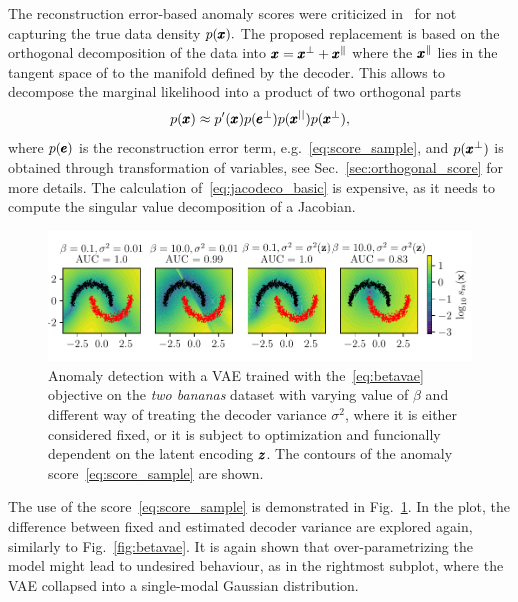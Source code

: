 The reconstruction error-based anomaly scores were criticized in~\cite{pidhorskyi2018generative} for not capturing the true data density $p(\pmb{{x}}).$ The proposed replacement is based on the orthogonal decomposition of the data into $\pmb{{x}}=\pmb{{x}}^\bot + \pmb{{x}}^{\parallel} $ where the $\pmb{{x}}^\parallel$  lies in the tangent space of to the manifold defined by the decoder. This allows to decompose the marginal likelihood into a product of two orthogonal parts
\begin{equation} \label{eq:jacodeco_basic}
    p(\pmb{{x}}) \approx p'(\pmb{{x}})p(\pmb{{e}}^{\bot}) p(\pmb{{x}}^{||})p(\pmb{{x}}^{\perp}),
\end{equation}
where $p(\pmb{{e}})$ is the reconstruction error term, e.g.~\eqref{eq:score_sample}, and $p(\pmb{{x}}^\bot)$ is obtained through transformation of variables, see Sec.~\ref{sec:orthogonal_score} for more details. The calculation of~\eqref{eq:jacodeco_basic} is expensive, as it needs to compute the singular value decomposition of a Jacobian.

\begin{figure}
\begin{centering}
\includegraphics[scale=0.98]{data/chapter_survey/vae_examples.pdf}
\end{centering}
\caption{Anomaly detection with a VAE trained with the~\eqref{eq:betavae} objective on the \textit{two bananas} dataset with varying value of $\beta$ and different way of treating the decoder variance $\sigma^2$, where it is either considered fixed, or it is subject to optimization and funcionally dependent on the latent encoding $\pmb{{z}}$. The contours of the anomaly score~\eqref{eq:score_sample} are shown.}
\label{fig:vae_examples}
\end{figure}

The use of the score~\eqref{eq:score_sample} is demonstrated in Fig.~\ref{fig:vae_examples}. In the plot, the difference between fixed and estimated decoder variance are explored again, similarly to Fig.~\ref{fig:betavae}. It is again shown that over-parametrizing the model might lead to undesired behaviour, as in the rightmost subplot, where the VAE collapsed into a single-modal Gaussian distribution.

